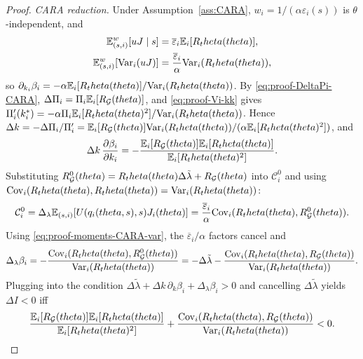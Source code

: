 \documentclass{class}
\begin{document}
\begin{proof}
\noindent\textit{CARA reduction.} Under Assumption~\ref{ass:CARA}, $w_i=1/(\alpha\varepsilon_i(s))$ is $\theta$-independent, and 
\begin{align}
\mathbb{E}_{(s,i)}^w[uJ\mid s] &= \overline\varepsilon_i\mathbb{E}_i[R_theta(theta)], \label{eq:proof-moments-CARA-uJ}\\
\mathbb{E}_{(s,i)}^w[\mathrm{Var}_i(uJ)] &= \frac{\overline\varepsilon_i}{\alpha}\mathrm{Var}_i(R_theta(theta)), \label{eq:proof-moments-CARA-var}
\end{align}
so $\partial_{k_i}\beta_i=-\alpha\mathbb{E}_i[R_theta(theta)]/\mathrm{Var}_i(R_theta(theta))$. By \ref{eq:proof-DeltaPi-CARA}, $\Delta\Pi_i=\Pi_i\mathbb{E}_i[R_{\mathcal{G}}(theta)]$, and \ref{eq:proof-Vi-kk} gives $\Pi_i'(k_i^\ast)=-\alpha\Pi_i\mathbb{E}_i[R_theta(theta)^2]/\mathrm{Var}_i(R_theta(theta))$. Hence $\Delta k=-\Delta\Pi_i/\Pi_i'=\mathbb{E}_i[R_{\mathcal{G}}(theta)]\mathrm{Var}_i(R_theta(theta))/(\alpha\mathbb{E}_i[R_theta(theta)^2])$, and \[ \Delta k\,\frac{\partial\beta_i}{\partial k_i}=-\frac{\mathbb{E}_i[R_{\mathcal{G}}(theta)]\mathbb{E}_i[R_theta(theta)]}{\mathbb{E}_i[R_theta(theta)^2]}. \] Substituting $R^0_{\mathcal{G}}(theta)=R_theta(theta)\Delta\tilde\lambda+R_{\mathcal{G}}(theta)$ into $\mathcal C_i^0$ and using $\mathrm{Cov}_i(R_theta(theta),R_theta(theta))=\mathrm{Var}_i(R_theta(theta))$: 
\begin{equation}\label{eq:proof-directeffect-CARA}
\mathcal C_i^0 = \Delta_\lambda\mathbb{E}_{(s,i)}\!\left[U(q_i(theta,s),s)J_i(theta)\right] = \frac{\overline\varepsilon_i}{\alpha}\mathrm{Cov}_i(R_theta(theta),R^0_{\mathcal{G}}(theta)).
\end{equation}
Using \eqref{eq:proof-moments-CARA-var}, the $\overline\varepsilon_i/\alpha$ factors cancel and
\begin{equation}\label{eq:proof-dbeta-lambda-CARA}
\Delta_\lambda\beta_i = -\frac{\mathrm{Cov}_i(R_theta(theta),R^0_{\mathcal{G}}(theta))}{\mathrm{Var}_i(R_theta(theta))}=-\Delta\tilde\lambda-\frac{\mathrm{Cov}_i(R_theta(theta),R_{\mathcal{G}}(theta))}{\mathrm{Var}_i(R_theta(theta))}.
\end{equation}
Plugging into the condition $\Delta\tilde\lambda+\Delta k\,\partial_k\beta_i+\Delta_\lambda\beta_i>0$ and cancelling $\Delta\tilde\lambda$ yields $\Delta I<0$ iff \[ \frac{\mathbb{E}_i[R_{\mathcal{G}}(theta)]\mathbb{E}_i[R_theta(theta)]}{\mathbb{E}_i[R_theta(theta)^2]}+\frac{\mathrm{Cov}_i(R_theta(theta),R_{\mathcal{G}}(theta))}{\mathrm{Var}_i(R_theta(theta))}<0. \qedhere \]


\end{proof}

\end{document}
